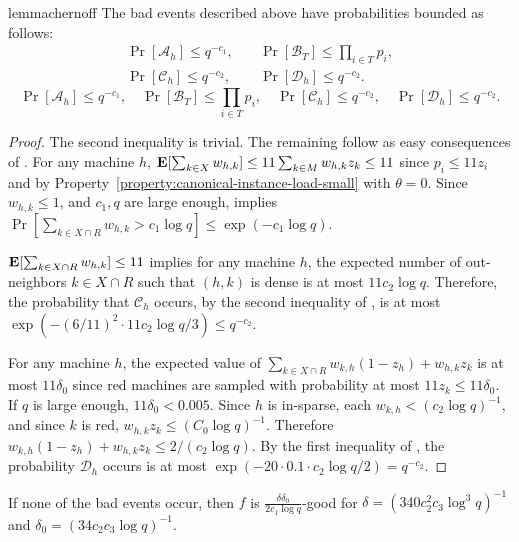 \documentclass[11pt]{article}
\newcounter{prop}
\newcommand{\cA}{{\mathscr A}}
\newcommand{\cB}{\mathscr{B}}
\newcommand{\cC}{{\mathscr C}}
\newcommand{\cD}{\mathscr{D}}
\newcommand{\Exp}{\EX}
\newcommand{\EX}{\hbox{\bf E}}
\begin{document}
\begin{restatable}{lemma}{chernoff}
\label{lem:probabilities}
The bad events described above have probabilities bounded as follows:
\ifdefined\CR
\begin{align*}
\Pr[\cA_h] \leq q^{-c_1}, &\quad \Pr[\cB_T] \leq \prod_{i \in T} p_i, \\
\Pr[\cC_h] \leq q^{-c_2}, &\quad \Pr[\cD_h] \leq q^{-c_2}.
\end{align*}
\else
\begin{equation*}
\Pr[\cA_h] \leq q^{-c_1}, \quad \Pr[\cB_T] \leq \prod_{i \in T} p_i, \quad \Pr[\cC_h] \leq q^{-c_2}, \quad \Pr[\cD_h] \leq q^{-c_2}.
\end{equation*}
\fi
\end{restatable}	

\begin{proof}
The second inequality is trivial. The remaining follow as easy consequences of . For any machine $h$, $\Exp[\sum_{k\in X} w_{h,k}] \leq 11\sum_{k\in M} w_{h,k}z_k \leq 11$ since $p_i\leq 11z_i$ and by Property~\ref{property:canonical-instance-load-small} with $\theta = 0$. Since $w_{h,k} \leq 1$, and $c_1,q$ are large enough,  implies $\Pr[\sum_{k\in X \cap R} w_{h,k} > c_1\log q] \leq \exp(-c_1\log q)$. 

$\Exp[\sum_{k\in X \cap R} w_{h,k}] \leq 11$ implies for any machine $h$, the expected number of out-neighbors $k\in X \cap R$ such that $(h,k)$ is dense is at most $11c_2\log q$.  Therefore, the probability that $\cC_h$ occurs, by the second inequality of ,  is at most $\exp(-(6/11)^2 \cdot 11c_2\log q /3) \leq q^{-c_2}$.

For any machine $h$, the expected value of $\sum_{k\in X \cap R} w_{k,h}(1-z_h) + w_{h,k}z_k$ is at most $11\delta_0$ since red machines are sampled with probability at most $11z_k \leq 11\delta_0$. If $q$ is large enough, $11\delta_0 < 0.005$.  Since $h$ is in-sparse, each $w_{k,h} < (c_2\log q)^{-1}$, and since $k$ is red, $w_{h,k}z_k \leq (C_0 \log q)^{-1}$.  Therefore $w_{k,h}(1-z_h) + w_{h,k}z_k \leq 2/(c_2\log q)$. By the first inequality of  , the probability $\cD_h$ occurs is at most $\exp(-20\cdot 0.1 \cdot c_2\log q/2) = q^{-c_2}$.
\end{proof}

\begin{lemma}\label{lem:no-bad-events-and-we-are-done}
If none of the bad events occur,  then $f$ is $\frac{\delta\delta_0}{2c_1\log q} $-good  for $\delta = (340c^2_2c_3\log^3 q)^{-1}$ and  $\delta_0 = (34c_2c_3\log q)^{-1}$.
\end{lemma}
\end{document}
